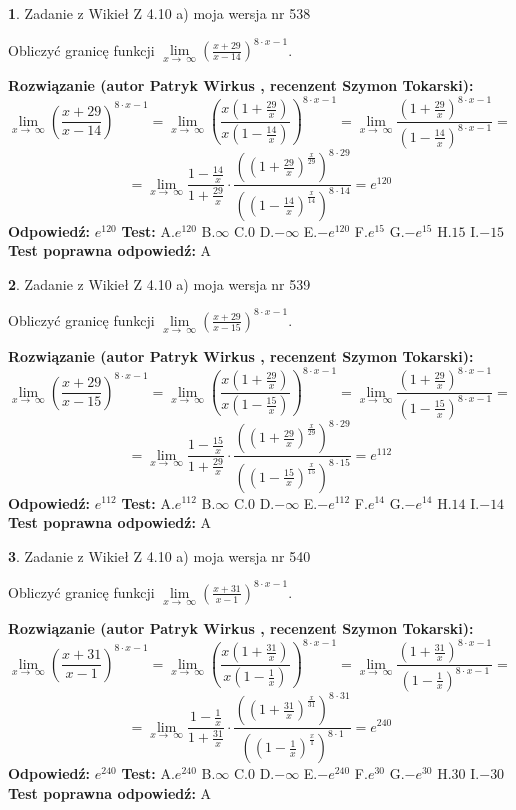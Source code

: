 \documentclass[12pt, a4paper]{article}
\theoremstyle{definition} %
\newtheorem{zad}{}
\newcommand{\zadStart}[1]{\begin{zad}#1\newline}
\newcommand{\zadStop}{\end{zad}}
\newcommand{\rozwStart}[2]{\noindent \textbf{Rozwiązanie (autor #1 , recenzent #2): }\newline}
\newcommand{\rozwStop}{\newline}
\newcommand{\odpStart}{\noindent \textbf{Odpowiedź:}\newline}
\newcommand{\odpStop}{\newline}
\newcommand{\testStart}{\noindent \textbf{Test:}\newline}
\newcommand{\testStop}{\newline}
\newcommand{\kluczStart}{\noindent \textbf{Test poprawna odpowiedź:}\newline}
\newcommand{\kluczStop}{\newline}
\begin{document}
\zadStart{Zadanie z Wikieł Z 4.10 a) moja wersja nr 538}

Obliczyć granicę funkcji  $\lim\limits_{x\to\ \infty}(\frac{x+29}{x-14})^{8\cdot x-1}$.
\zadStop
\rozwStart{Patryk Wirkus}{Szymon Tokarski}
$$\lim\limits_{x\to\ \infty}(\frac{x+29}{x-14})^{8\cdot x-1} = \lim\limits_{x\to\ \infty}(\frac{x(1+\frac{29}{x})}{x(1-\frac{14}{x})})^{8\cdot x-1}=\lim\limits_{x\to\ \infty}\frac{(1+\frac{29}{x})^{8\cdot x-1}}{(1-\frac{14}{x})^{8\cdot x-1}}=$$
$$=\lim\limits_{x\to\ \infty}\frac{1-\frac{14}{x}}{1+\frac{29}{x}}\cdot\frac{((1+\frac{29}{x})^{\frac{x}{29}})^{8\cdot29}}{((1-\frac{14}{x})^{\frac{x}{14}})^{8\cdot14}}=e^{120}$$
\rozwStop
\odpStart
$e^{120}$
\odpStop
\testStart
A.$e^{120}$ B.$\infty$ C.$0$ D.$-\infty$ E.$-e^{120}$
F.$e^{15}$ G.$-e^{15}$
H.$15$
I.$-15$
\testStop
\kluczStart
A
\kluczStop



\zadStart{Zadanie z Wikieł Z 4.10 a) moja wersja nr 539}

Obliczyć granicę funkcji  $\lim\limits_{x\to\ \infty}(\frac{x+29}{x-15})^{8\cdot x-1}$.
\zadStop
\rozwStart{Patryk Wirkus}{Szymon Tokarski}
$$\lim\limits_{x\to\ \infty}(\frac{x+29}{x-15})^{8\cdot x-1} = \lim\limits_{x\to\ \infty}(\frac{x(1+\frac{29}{x})}{x(1-\frac{15}{x})})^{8\cdot x-1}=\lim\limits_{x\to\ \infty}\frac{(1+\frac{29}{x})^{8\cdot x-1}}{(1-\frac{15}{x})^{8\cdot x-1}}=$$
$$=\lim\limits_{x\to\ \infty}\frac{1-\frac{15}{x}}{1+\frac{29}{x}}\cdot\frac{((1+\frac{29}{x})^{\frac{x}{29}})^{8\cdot29}}{((1-\frac{15}{x})^{\frac{x}{15}})^{8\cdot15}}=e^{112}$$
\rozwStop
\odpStart
$e^{112}$
\odpStop
\testStart
A.$e^{112}$ B.$\infty$ C.$0$ D.$-\infty$ E.$-e^{112}$
F.$e^{14}$ G.$-e^{14}$
H.$14$
I.$-14$
\testStop
\kluczStart
A
\kluczStop



\zadStart{Zadanie z Wikieł Z 4.10 a) moja wersja nr 540}

Obliczyć granicę funkcji  $\lim\limits_{x\to\ \infty}(\frac{x+31}{x-1})^{8\cdot x-1}$.
\zadStop
\rozwStart{Patryk Wirkus}{Szymon Tokarski}
$$\lim\limits_{x\to\ \infty}(\frac{x+31}{x-1})^{8\cdot x-1} = \lim\limits_{x\to\ \infty}(\frac{x(1+\frac{31}{x})}{x(1-\frac{1}{x})})^{8\cdot x-1}=\lim\limits_{x\to\ \infty}\frac{(1+\frac{31}{x})^{8\cdot x-1}}{(1-\frac{1}{x})^{8\cdot x-1}}=$$
$$=\lim\limits_{x\to\ \infty}\frac{1-\frac{1}{x}}{1+\frac{31}{x}}\cdot\frac{((1+\frac{31}{x})^{\frac{x}{31}})^{8\cdot31}}{((1-\frac{1}{x})^{\frac{x}{1}})^{8\cdot1}}=e^{240}$$
\rozwStop
\odpStart
$e^{240}$
\odpStop
\testStart
A.$e^{240}$ B.$\infty$ C.$0$ D.$-\infty$ E.$-e^{240}$
F.$e^{30}$ G.$-e^{30}$
H.$30$
I.$-30$
\testStop
\kluczStart
A
\kluczStop
\end{document}
